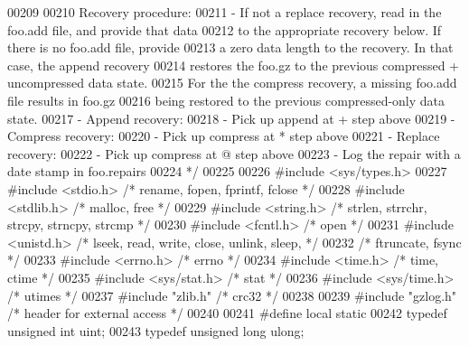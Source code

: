 \begin{DoxyCode}
00209 \textcolor{comment}{}
00210 \textcolor{comment}{   Recovery procedure:}
00211 \textcolor{comment}{   - If not a replace recovery, read in the foo.add file, and provide that data}
00212 \textcolor{comment}{     to the appropriate recovery below.  If there is no foo.add file, provide}
00213 \textcolor{comment}{     a zero data length to the recovery.  In that case, the append recovery}
00214 \textcolor{comment}{     restores the foo.gz to the previous compressed + uncompressed data state.}
00215 \textcolor{comment}{     For the the compress recovery, a missing foo.add file results in foo.gz}
00216 \textcolor{comment}{     being restored to the previous compressed-only data state.}
00217 \textcolor{comment}{   - Append recovery:}
00218 \textcolor{comment}{     - Pick up append at + step above}
00219 \textcolor{comment}{   - Compress recovery:}
00220 \textcolor{comment}{     - Pick up compress at * step above}
00221 \textcolor{comment}{   - Replace recovery:}
00222 \textcolor{comment}{     - Pick up compress at @ step above}
00223 \textcolor{comment}{   - Log the repair with a date stamp in foo.repairs}
00224 \textcolor{comment}{ */}
00225 
00226 \textcolor{preprocessor}{#include <sys/types.h>}
00227 \textcolor{preprocessor}{#include <stdio.h>}      \textcolor{comment}{/* rename, fopen, fprintf, fclose */}
00228 \textcolor{preprocessor}{#include <stdlib.h>}     \textcolor{comment}{/* malloc, free */}
00229 \textcolor{preprocessor}{#include <string.h>}     \textcolor{comment}{/* strlen, strrchr, strcpy, strncpy, strcmp */}
00230 \textcolor{preprocessor}{#include <fcntl.h>}      \textcolor{comment}{/* open */}
00231 \textcolor{preprocessor}{#include <unistd.h>}     \textcolor{comment}{/* lseek, read, write, close, unlink, sleep, */}
00232                         \textcolor{comment}{/* ftruncate, fsync */}
00233 \textcolor{preprocessor}{#include <errno.h>}      \textcolor{comment}{/* errno */}
00234 \textcolor{preprocessor}{#include <time.h>}       \textcolor{comment}{/* time, ctime */}
00235 \textcolor{preprocessor}{#include <sys/stat.h>}   \textcolor{comment}{/* stat */}
00236 \textcolor{preprocessor}{#include <sys/time.h>}   \textcolor{comment}{/* utimes */}
00237 \textcolor{preprocessor}{#include "zlib.h"}       \textcolor{comment}{/* crc32 */}
00238 
00239 \textcolor{preprocessor}{#include "gzlog.h"}      \textcolor{comment}{/* header for external access */}
00240 
00241 \textcolor{preprocessor}{#define local static}
00242 \textcolor{keyword}{typedef} \textcolor{keywordtype}{unsigned} \textcolor{keywordtype}{int} uint;
00243 \textcolor{keyword}{typedef} \textcolor{keywordtype}{unsigned} \textcolor{keywordtype}{long} ulong;

\end{DoxyCode}
